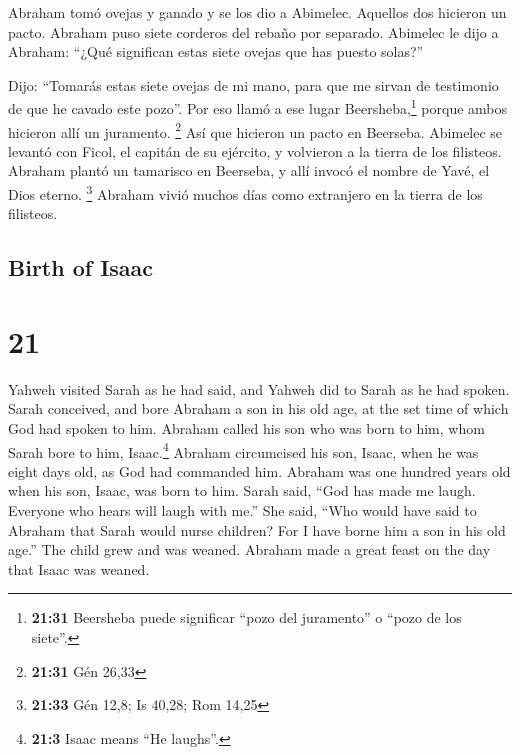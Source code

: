 \begin{paracol}{2}
 Abraham tomó ovejas y ganado y se los dio a Abimelec.
Aquellos dos hicieron un pacto.  Abraham puso siete
corderos del rebaño por separado.  Abimelec le dijo a
Abraham: ``¿Qué significan estas siete ovejas que has puesto solas?''

 Dijo: ``Tomarás estas siete ovejas de mi mano, para que
me sirvan de testimonio de que he cavado este pozo''. 
Por eso llamó a ese lugar Beersheba,\footnote{\textbf{21:31} Beersheba
  puede significar ``pozo del juramento'' o ``pozo de los siete''.}
porque ambos hicieron allí un juramento. \footnote{\textbf{21:31} Gén
  26,33}  Así que hicieron un pacto en Beerseba. Abimelec
se levantó con Ficol, el capitán de su ejército, y volvieron a la tierra
de los filisteos.  Abraham plantó un tamarisco en
Beerseba, y allí invocó el nombre de Yavé, el Dios eterno. \footnote{\textbf{21:33}
  Gén 12,8; Is 40,28; Rom 14,25}  Abraham vivió muchos
días como extranjero en la tierra de los filisteos.

\switchcolumn
\begin{otherlanguage}{english}

\hypertarget{birth-of-isaac}{%
\subsection{Birth of Isaac}\label{birth-of-isaac}}

\hypertarget{section-41}{%
\section{21}\label{section-41}}

 Yahweh visited Sarah as he had said, and Yahweh did to
Sarah as he had spoken.  Sarah conceived, and bore Abraham
a son in his old age, at the set time of which God had spoken to him.
 Abraham called his son who was born to him, whom Sarah
bore to him, Isaac.\footnote{\textbf{21:3} Isaac means ``He laughs''.}
 Abraham circumcised his son, Isaac, when he was eight
days old, as God had commanded him.  Abraham was one
hundred years old when his son, Isaac, was born to him. 
Sarah said, ``God has made me laugh. Everyone who hears will laugh with
me.''  She said, ``Who would have said to Abraham that
Sarah would nurse children? For I have borne him a son in his old age.''
 The child grew and was weaned. Abraham made a great feast
on the day that Isaac was weaned.


\end{otherlanguage}
\end{paracol}
